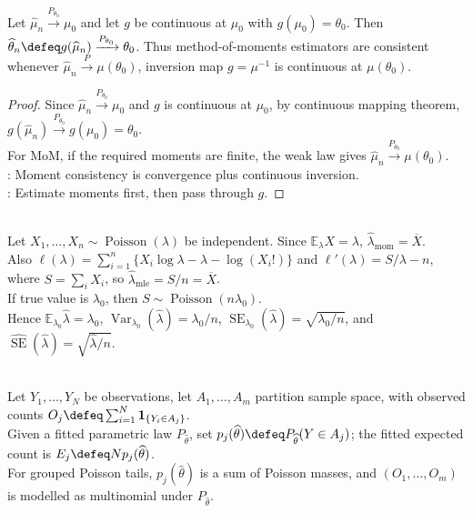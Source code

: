 \begin{proposition} \label{prop:method-of-moments-consistency} \\
Let $\widehat{\mu}_n\xrightarrow{P_{\theta_0}}\mu_0$ and let $g$ be continuous at $\mu_0$ with $g(\mu_0)=\theta_0$. Then $\widehat{\theta}_n\defeq g(\widehat{\mu}_n)\xrightarrow{P_{\theta_0}}\theta_0$. Thus method-of-moments estimators are consistent whenever $\widehat{\mu}_n\xrightarrow{P}\mu(\theta_0)$, inversion map $g=\mu^{-1}$ is continuous at $\mu(\theta_0)$.
\begin{proof} Since $\widehat{\mu}_n\xrightarrow{P_{\theta_0}}\mu_0$ and $g$ is continuous at $\mu_0$, by continuous mapping theorem, $g(\widehat{\mu}_n)\xrightarrow{P_{\theta_0}}g(\mu_0)=\theta_0$.\\
For MoM, if the required moments are finite, the weak law gives $\widehat{\mu}_n\xrightarrow{P_{\theta_0}}\mu(\theta_0)$.\\
: Moment consistency is convergence plus continuous inversion.\\
: Estimate moments first, then pass through $g$.
\end{proof}
\end{proposition}

\begin{example} \label{ex:poisson-moments-likelihood-standard-error} \\
Let $X_1,\ldots,X_n\sim\operatorname{Poisson}(\lambda)$ be independent. Since $\mathbb{E}_\lambda X=\lambda$, $\widehat{\lambda}_{\mathrm{mom}}=\overline{X}$.\\
Also $\ell(\lambda)=\sum_{i=1}^{n}\{X_i\log\lambda-\lambda-\log(X_i!)\}$ and $\ell'(\lambda)=S/\lambda-n$, where $S=\sum_iX_i$, so $\widehat{\lambda}_{\mathrm{mle}}=S/n=\overline{X}$.\\
If true value is $\lambda_0$, then $S\sim\operatorname{Poisson}(n\lambda_0)$.\\
Hence $\mathbb{E}_{\lambda_0}\widehat{\lambda}=\lambda_0$, $\operatorname{Var}_{\lambda_0}(\widehat{\lambda})=\lambda_0/n$, $\operatorname{SE}_{\lambda_0}(\widehat{\lambda})=\sqrt{\lambda_0/n}$, and $\widehat{\operatorname{SE}}(\widehat{\lambda})=\sqrt{\widehat{\lambda}/n}$.
\end{example}

\begin{remark} \label{rem:grouped-poisson-fit-expected-cell-counts} \\
Let $Y_1,\ldots,Y_N$ be observations, let $A_1,\ldots,A_m$ partition sample space, with observed counts $O_j\defeq\sum_{i=1}^{N}\mathbf{1}_{\{Y_i\in A_j\}}$.\\
Given a fitted parametric law $P_{\widehat{\theta}}$, set $p_j(\widehat{\theta})\defeq P_{\widehat{\theta}}(Y\in A_j)$; the fitted expected count is $E_j\defeq Np_j(\widehat{\theta})$.\\
For grouped Poisson tails, $p_j(\widehat{\theta})$ is a sum of Poisson masses, and $(O_1,\ldots,O_m)$ is modelled as multinomial under $P_{\widehat{\theta}}$.
\end{remark}

